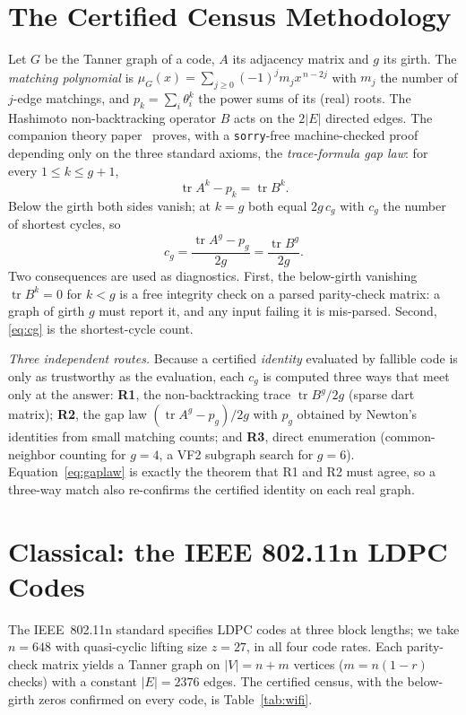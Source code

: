 \documentclass[journal]{IEEEtran}
\DeclareMathOperator{\tr}{tr}
\begin{document}
\section{The Certified Census Methodology}
\label{sec:method}
Let $G$ be the Tanner graph of a code, $A$ its adjacency matrix and $g$ its girth. The
\emph{matching polynomial} is $\mu_G(x)=\sum_{j\ge0}(-1)^j m_j x^{\,n-2j}$ with $m_j$ the
number of $j$-edge matchings, and $p_k=\sum_i\theta_i^k$ the power sums of its (real) roots.
The Hashimoto non-backtracking operator $B$ acts on the $2|E|$ directed edges. The companion
theory paper~\cite{PartVI} proves, with a \texttt{sorry}-free machine-checked proof depending
only on the three standard axioms, the \emph{trace-formula gap law}: for every
$1\le k\le g+1$,
\begin{equation}
\tr A^k - p_k = \tr B^k .
\label{eq:gaplaw}
\end{equation}
Below the girth both sides vanish; at $k=g$ both equal $2g\,c_g$ with $c_g$ the number of
shortest cycles, so
\begin{equation}
c_g = \frac{\tr A^g - p_g}{2g} = \frac{\tr B^g}{2g}.
\label{eq:cg}
\end{equation}
Two consequences are used as diagnostics. First, the below-girth vanishing $\tr B^k=0$ for
$k<g$ is a free integrity check on a parsed parity-check matrix: a graph of girth $g$ must
report it, and any input failing it is mis-parsed. Second, \eqref{eq:cg} is the shortest-cycle
count.

\emph{Three independent routes.} Because a certified \emph{identity} evaluated by fallible code
is only as trustworthy as the evaluation, each $c_g$ is computed three ways that meet only at
the answer: \textbf{R1}, the non-backtracking trace $\tr B^g/2g$ (sparse dart matrix);
\textbf{R2}, the gap law $(\tr A^g-p_g)/2g$ with $p_g$ obtained by Newton's identities from
small matching counts; and \textbf{R3}, direct enumeration (common-neighbor counting for
$g=4$, a VF2 subgraph search for $g=6$). Equation~\eqref{eq:gaplaw} is exactly the theorem that
R1 and R2 must agree, so a three-way match also re-confirms the certified identity on each real
graph.

\section{Classical: the IEEE 802.11n LDPC Codes}
\label{sec:wifi}
The IEEE~802.11n standard specifies LDPC codes at three block lengths; we take $n=648$ with
quasi-cyclic lifting size $z=27$, in all four code rates. Each parity-check matrix yields a
Tanner graph on $|V|=n+m$ vertices ($m=n(1-r)$ checks) with a constant $|E|=2376$ edges. The
certified census, with the below-girth zeros confirmed on every code, is
Table~\ref{tab:wifi}.
\end{document}
